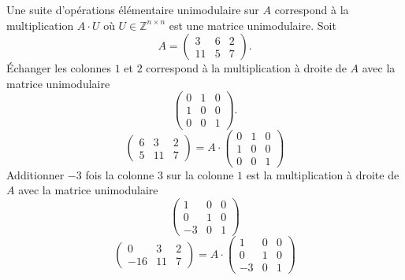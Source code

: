 \begin{example}
  \label{exe:27}
  Une suite d'opérations élémentaire unimodulaire sur $A$ correspond à la multiplication $A⋅U$ où $U ∈ℤ^{n ×n}$ est une matrice unimodulaire.
Soit 
  \begin{displaymath}
    A =
    \begin{pmatrix}
      3 & 6 & 2 \\
      11 & 5 & 7
    \end{pmatrix}. 
  \end{displaymath}
  Échanger les colonnes $1$ et $2$ correspond à la multiplication à droite de $A$ avec la matrice unimodulaire 
  \begin{displaymath}
    \begin{pmatrix}
    0& 1 & 0 \\
    1 & 0 & 0 \\
    0 & 0 & 1
      
    \end{pmatrix}.
  \end{displaymath}
  \begin{displaymath}
     \begin{pmatrix}
      6  & 3& 2 \\
       5 & 11 & 7
     \end{pmatrix} = A ⋅
     \begin{pmatrix}
       0& 1 & 0 \\
       1 & 0 & 0 \\
       0 & 0 & 1
     \end{pmatrix}
   \end{displaymath}
   Additionner $-3$ fois la colonne $3$ sur la colonne $1$ est la multiplication à droite de $A$ avec la matrice unimodulaire 
   \begin{displaymath}
     \begin{pmatrix}       
     1 & 0 & 0\\ 
     0 & 1 & 0 \\
     -3 & 0 & 1
   \end{pmatrix}
 \end{displaymath} 
   \begin{displaymath}
     \begin{pmatrix}
      0  & 3& 2 \\
      -16 & 11 & 7
    \end{pmatrix} = A ⋅  \begin{pmatrix}
      
     1 & 0 & 0\\
     0 & 1 & 0 \\ 
     -3 & 0 & 1
   \end{pmatrix}
 \end{displaymath}
\end{example}


